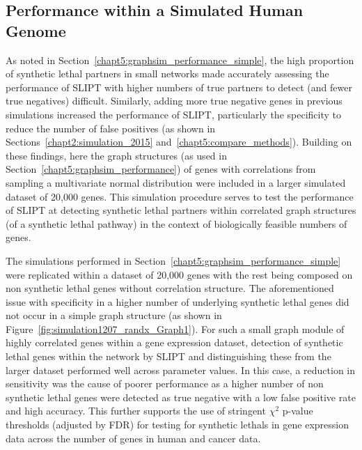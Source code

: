 \FloatBarrier

\subsection{Performance within a Simulated Human Genome}
\label{chapt5:graphsim_performance_20K}

\FloatBarrier


As noted in Section~\ref{chapt5:graphsim_performance_simple}, the high proportion of \gls{synthetic lethal} partners in small networks made accurately assessing the performance of \gls{SLIPT} with higher numbers of true partners to detect (and fewer true negatives) difficult. Similarly, adding more true negative genes in previous simulations increased the performance of \gls{SLIPT}, particularly the specificity to reduce the number of false positives (as shown in Sections~\ref{chapt2:simulation_2015} and~\ref{chapt5:compare_methods}). Building on these findings, here the \gls{graph} structures (as used in Section~\ref{chapt5:graphsim_performance}) of genes with correlations from sampling a multivariate normal distribution were included in a larger simulated dataset of 20,000 genes. This simulation procedure serves to test the performance of \gls{SLIPT} at detecting \gls{synthetic lethal} partners within correlated \gls{graph} structures (of a \gls{synthetic lethal} pathway) in the context of biologically feasible numbers of genes. 



The simulations performed in Section~\ref{chapt5:graphsim_performance_simple} were replicated within a dataset of 20,000 genes with the rest being composed on non \gls{synthetic lethal} genes without correlation structure. The aforementioned issue with specificity in a higher number of underlying \gls{synthetic lethal} genes did not occur in a simple \gls{graph} structure (as shown in Figure~\ref{fig:simulation1207_randx_Graph1}). For such a small graph module of highly correlated genes within a \gls{gene expression} dataset, detection of \gls{synthetic lethal} genes within the network by \gls{SLIPT} and distinguishing these from the larger dataset performed well across parameter values. In this case, a reduction in sensitivity was the cause of poorer performance as a higher number of non \gls{synthetic lethal} genes were detected as true negative with a low false positive rate and high accuracy. This further supports the use of stringent $\chi^2$ p-value thresholds (adjusted by \gls{FDR}) for testing for \glspl{synthetic lethal} in \gls{gene expression} data across the number of genes in human and cancer data.


